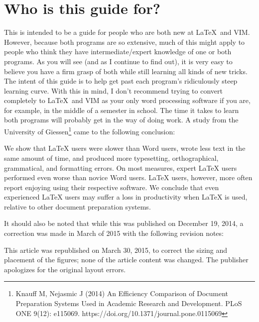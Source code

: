 \documentclass[a4paper, 12pt, twoside]{book}
\begin{document}
\section*{Who is this guide for?}
This is intended to be a guide for people who are both new at \LaTeX\ and VIM. However, because both programs are so extensive, much of this might apply to people who think they have intermediate/expert knowledge of one or both programs. As you will see (and as I continue to find out), it is very easy to believe you have a firm grasp of both while still learning all kinds of new tricks. The intent of this guide is to help get past each program's ridiculously steep learning curve. With this in mind, I don't recommend trying to convert completely to \LaTeX\ and VIM as your only word processing software if you are, for example, in the middle of a semester in school. The time it takes to learn both programs will probably get in the way of doing work. A study from the University of Giessen\footnote{Knauff M, Nejasmic J (2014) An Efficiency Comparison of Document Preparation Systems Used in Academic Research and Development. PLoS ONE 9(12): e115069. https://doi.org/10.1371/journal.pone.0115069} came to the following conclusion:
\begin{displayquote}
    We show that LaTeX users were slower than Word users, wrote less text in the same amount of time, and produced more typesetting, orthographical, grammatical, and formatting errors. On most measures, expert LaTeX users performed even worse than novice Word users. LaTeX users, however, more often report enjoying using their respective software. We conclude that even experienced LaTeX users may suffer a loss in productivity when LaTeX is used, relative to other document preparation systems.
\end{displayquote}
It should also be noted that while this was published on December 19, 2014, a correction was made in March of 2015 with the following revision notes:
\begin{displayquote}
    This article was republished on March 30, 2015, to correct the sizing and placement of the figures; none of the article content was changed. The publisher apologizes for the original layout errors.
\end{displayquote}
\end{document}
